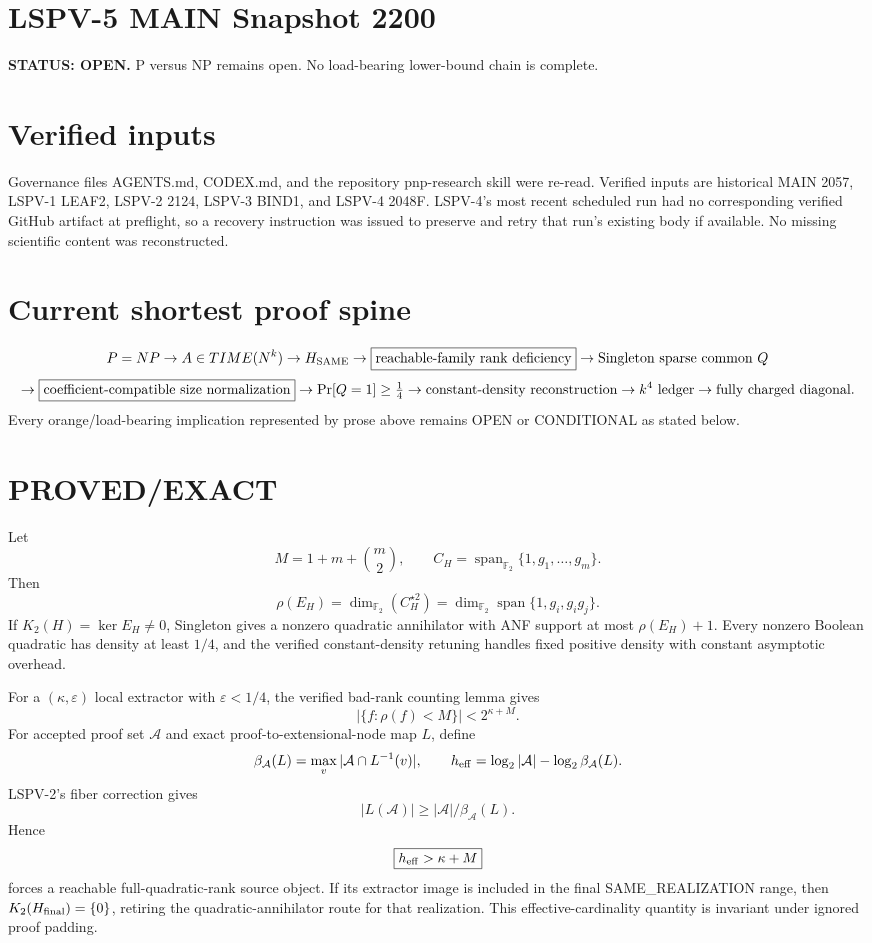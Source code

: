 \documentclass[11pt]{article}
\begin{document}
\section*{LSPV-5 MAIN Snapshot 2200}
\textbf{STATUS: OPEN.} P versus NP remains open. No load-bearing lower-bound chain is complete.

\section*{Verified inputs}
Governance files AGENTS.md, CODEX.md, and the repository pnp-research skill were re-read. Verified inputs are historical MAIN 2057, LSPV-1 LEAF2, LSPV-2 2124, LSPV-3 BIND1, and LSPV-4 2048F. LSPV-4's most recent scheduled run had no corresponding verified GitHub artifact at preflight, so a recovery instruction was issued to preserve and retry that run's existing body if available. No missing scientific content was reconstructed.

\section*{Current shortest proof spine}
\[
P=NP\to A\in TIME(N^k)\to H_{\rm SAME}
\to \boxed{\hbox{reachable-family rank deficiency}}
\to \hbox{Singleton sparse common }Q
\]
\[
\to \boxed{\hbox{coefficient-compatible size normalization}}
\to \Pr[Q=1]\ge\tfrac14
\to \hbox{constant-density reconstruction}
\to k^4\hbox{ ledger}
\to \hbox{fully charged diagonal}.
\]
Every orange/load-bearing implication represented by prose above remains OPEN or CONDITIONAL as stated below.

\section*{PROVED/EXACT}
Let
\[
M=1+m+\binom m2,\qquad
C_H=\operatorname{span}_{\mathbb F_2}\{1,g_1,\ldots,g_m\}.
\]
Then
\[
\rho(E_H)=\dim_{\mathbb F_2}(C_H^{\star2})
=\dim_{\mathbb F_2}\operatorname{span}\{1,g_i,g_i g_j\}.
\]
If \(K_2(H)=\ker E_H\ne0\), Singleton gives a nonzero quadratic annihilator with ANF support at most \(\rho(E_H)+1\). Every nonzero Boolean quadratic has density at least \(1/4\), and the verified constant-density retuning handles fixed positive density with constant asymptotic overhead.

For a \((\kappa,\varepsilon)\) local extractor with \(\varepsilon<1/4\), the verified bad-rank counting lemma gives
\[
|\{f:\rho(f)<M\}|<2^{\kappa+M}.
\]
For accepted proof set \(\mathcal A\) and exact proof-to-extensional-node map \(L\), define
\[
\beta_{\mathcal A}(L)=\max_v|\mathcal A\cap L^{-1}(v)|,
\qquad
h_{\rm eff}=\log_2|\mathcal A|-\log_2\beta_{\mathcal A}(L).
\]
LSPV-2's fiber correction gives
\[
|L(\mathcal A)|\ge |\mathcal A|/\beta_{\mathcal A}(L).
\]
Hence
\[
\boxed{h_{\rm eff}>\kappa+M}
\]
forces a reachable full-quadratic-rank source object. If its extractor image is included in the final SAME_REALIZATION range, then \(K_2(H_{\rm final})=\{0\}\), retiring the quadratic-annihilator route for that realization. This effective-cardinality quantity is invariant under ignored proof padding.
\end{document}
